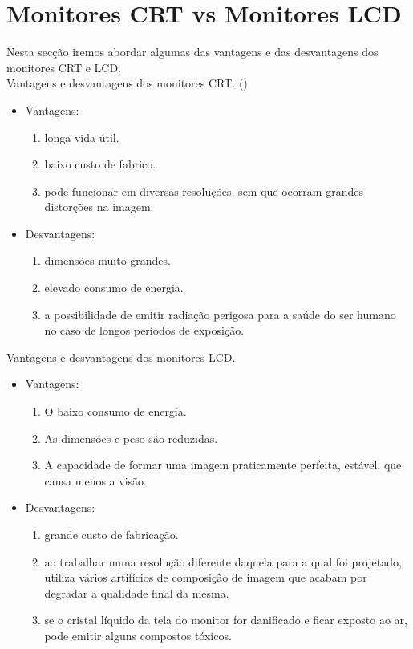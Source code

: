 \documentclass[a4paper]{report}
\begin{document}
\section{Monitores CRT vs Monitores LCD}
Nesta secção iremos abordar algumas das vantagens e das desvantagens dos monitores CRT e LCD.\\
Vantagens e desvantagens dos monitores CRT. (\cite{mv})
\begin{itemize}
	\item Vantagens:
		\begin{enumerate}
		\item longa vida útil.
		\item baixo custo de fabrico.
		\item  pode funcionar em diversas resoluções, sem que ocorram grandes distorções na imagem.
		\end{enumerate}
\end{itemize}
\begin{itemize}
	\item Desvantagens:
		\begin{enumerate}
		\item dimensões muito grandes.
		\item elevado consumo de energia.
		\item a possibilidade de emitir radiação perigosa para a saúde do ser humano  no caso de longos períodos de exposição.
		\end{enumerate}
\end{itemize}
Vantagens e desvantagens dos monitores LCD.
\begin{itemize}
	\item Vantagens:
		\begin{enumerate}
		\item O baixo consumo de energia.
		\item As dimensões e peso são reduzidas.
		\item A capacidade de formar uma imagem praticamente perfeita, estável, que cansa menos a visão.
		\end{enumerate}
\end{itemize}
\begin{itemize}
	\item Desvantagens:
		\begin{enumerate}
		\item grande custo de fabricação.
		\item ao trabalhar numa resolução diferente daquela para a qual foi projetado, utiliza vários artifícios de composição de imagem que acabam por degradar a qualidade final da mesma.
		\item se o cristal líquido da tela do monitor for danificado e ficar exposto ao ar, pode emitir alguns compostos tóxicos.
		\end{enumerate}
\end{itemize}
\end{document}
